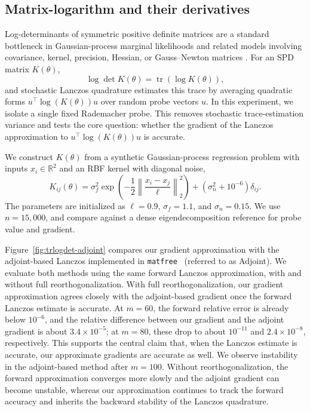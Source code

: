 \documentclass{article}
\begin{document}
\subsection{Matrix-logarithm and their derivatives}
\label{subsec:experiments_logdet}

Log-determinants of symmetric positive definite matrices are a standard bottleneck in
Gaussian-process marginal likelihoods and related models involving covariance, kernel,
precision, Hessian, or Gauss--Newton matrices
\citep{rasmussen2006gaussian,gardner2018gpytorch,ubaru2017fast,dong2017scalable,immer2021scalable}.
For an SPD matrix $K(\theta)$,
\[
    \log\det K(\theta)=\operatorname{tr}(\log K(\theta)),
\]
and stochastic Lanczos quadrature estimates this trace by averaging quadratic forms
$u^\top \log(K(\theta))u$ over random probe vectors $u$. In this experiment, we isolate
a single fixed Rademacher probe. This removes stochastic trace-estimation variance and
tests the core question: whether the gradient of the Lanczos approximation to
$u^\top\log(K(\theta))u$ is accurate.

We construct $K(\theta)$ from a synthetic Gaussian-process regression problem with
inputs $x_i\in\mathbb{R}^2$ and an RBF kernel with diagonal noise,
\[
K_{ij}(\theta)
=
\sigma_f^2
\exp\!\left(
-\frac{1}{2}\left\|\frac{x_i-x_j}{\ell}\right\|_2^2
\right)
+
(\sigma_n^2+10^{-6})\delta_{ij}.
\]
The parameters are initialized as
$\ell=0.9$, $\sigma_f=1.1$, and $\sigma_n=0.15$. We use
$n=15{,}000$, and compare against a dense eigendecomposition reference for probe
value and gradient.

Figure~\ref{fig:trlogdet-adjoint} compares our gradient approximation with the
adjoint-based Lanczos implemented in \texttt{matfree}~\cite{kramer2024gradients} (referred to as Adjoint). We evaluate both methods
using the same forward Lanczos approximation, with and without full reorthogonalization.
With full reorthogonalization, our gradient approximation agrees closely with the
adjoint-based gradient once the forward Lanczos estimate is accurate. At \(m=60\), the
forward relative error is already below \(10^{-6}\), and the relative difference between
our gradient and the adjoint gradient is about \(3.4\times 10^{-5}\); at \(m=80\), these
drop to about \(10^{-11}\) and \(2.4\times 10^{-8}\), respectively. This supports the
central claim that, when the Lanczos estimate is accurate, our approximate gradients are accurate as well. We observe instability in the adjoint-based method after $m=100$. 
Without reorthogonalization, the
forward approximation converges more slowly and the adjoint gradient can become unstable,
whereas our approximation continues to track the forward accuracy and inherits the backward stability of the Lanczos quadrature.
\end{document}
